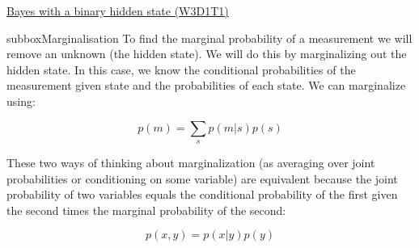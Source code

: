\begin{textbox}{\href{https://compneuro.neuromatch.io/tutorials/W3D1_BayesianDecisions/student/W3D1_Tutorial1.html}{Bayes with a binary hidden state (W3D1T1)} }
\begin{subbox}{subbox}{Marginalisation}
To find the marginal probability of a measurement we will remove an unknown (the hidden state). We will do this by marginalizing out the hidden state. In this case, we know the conditional probabilities of the measurement given state and the probabilities of each state. We can marginalize using:

$$p(m) = \sum_s p(m | s) p(s) $$

These two ways of thinking about marginalization (as averaging over joint probabilities or conditioning on some variable) are equivalent because the joint probability of two variables equals the conditional probability of the first given the second times the marginal probability of the second:

$$p(x, y) = p(x|y)p(y)$$ 


\end{subbox}

\end{textbox}

